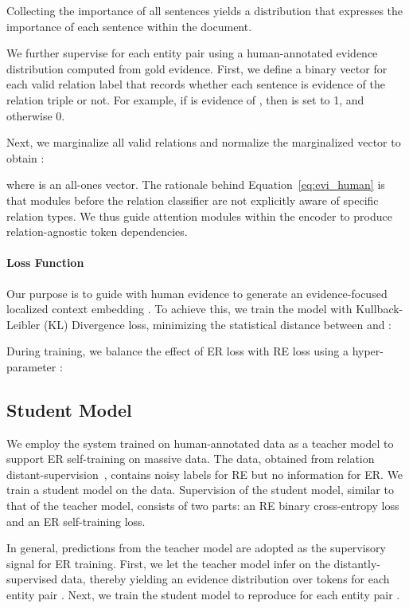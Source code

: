 \documentclass[11pt]{article}
\begin{document}
Collecting the importance of all sentences yields a distribution  that expresses the importance of each sentence within the document. 

We further supervise  for each entity pair  using a human-annotated evidence distribution computed from gold evidence.
First, we define a binary vector  for each valid relation label  that records whether each sentence  is evidence of the relation triple  or not.
For example, if  is evidence of , then  is set to 1, and otherwise 0.

Next, we marginalize all valid relations and normalize the marginalized vector to obtain :

where  is an all-ones vector.
The rationale behind Equation~\ref{eq:evi_human} is that modules before the relation classifier are not explicitly aware of specific relation types.
We thus guide attention modules within the encoder to produce relation-agnostic token dependencies.

\paragraph{Loss Function} Our purpose is to guide  with human evidence  to generate an evidence-focused localized context embedding .
To achieve this, we train the model with Kullback-Leibler (KL) Divergence loss, minimizing the statistical distance between  and :


During training, we balance the effect of ER loss with RE loss using a hyper-parameter :


\subsection{Student Model}

We employ the system trained on human-annotated data as a teacher model to support ER self-training on massive data. 
The data, obtained from relation distant-supervision~\cite{mintz-etal-2009-distant}, contains noisy labels for RE but no information for ER.
We train a student model on the data.
Supervision of the student model, similar to that of the teacher model, consists of two parts:
an RE binary cross-entropy loss and an ER self-training loss.

In general, predictions from the teacher model are adopted as the supervisory signal for ER training.
First, we let the teacher model infer on the distantly-supervised data, thereby yielding an evidence distribution over tokens  for each entity pair .
Next, we train the student model to reproduce  for each entity pair .
\end{document}
